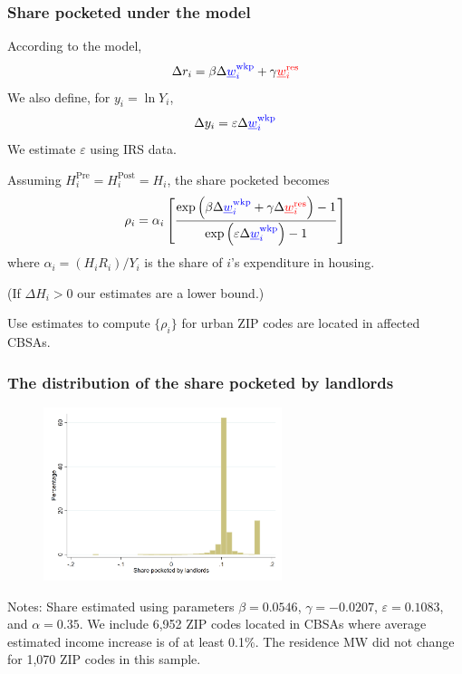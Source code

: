 \documentclass[aspectratio=169, t]{beamer}
\newcommand{\mw}{\underline{w}}
\newcommand{\wkp}{\text{wkp}}
\newcommand{\res}{\text{res}}
\newcommand{\pre}{\text{Pre}}
\newcommand{\post}{\text{Post}}
\begin{document}
\begin{frame}[label = share_pocketed_model]
    \frametitle{Share pocketed under the model}

    According to the model,
    $$
    \Delta r_i = \beta \Delta {\color{blue}\mw_i^{\wkp}} + \gamma {\color{red}\mw_i^{\res}}
    $$
    We also define, for $y_i = \ln Y_i$,
    $$
    \Delta y_i = \varepsilon \Delta {\color{blue}\mw_i^{\wkp}}
    $$
    We estimate $\varepsilon$ using IRS data. \hyperlink{wages_results}{}

    \pause
    \vspace{3mm}
    Assuming $H^{\pre}_i = H^{\post}_i = H_i$, the share pocketed becomes
    \begin{equation*}
        \rho_i = \alpha_i \left[
                  \frac{\exp \left( \beta \Delta {\color{blue}\mw_i^{\wkp}} 
                                 + \gamma \Delta {\color{red}\mw_i^{\res}} \right) - 1 }
                       {\exp \left( \varepsilon \Delta {\color{blue}\mw_i^{\wkp}}  \right) - 1 }
                         \right]
    \end{equation*}
    where $\alpha_i = \left(H_i R_i\right)/Y_i$ is the share of $i$'s expenditure in housing.
    
    {\small (If $\Delta H_i > 0$ our estimates are a lower bound.)}

    \pause
    \vspace{3mm}
    Use estimates to compute $\{\rho_i\}$ for urban ZIP codes are located in affected CBSAs.
\end{frame}

\begin{frame}
    \frametitle{The distribution of the share pocketed by landlords}
    
    \vspace{1mm}
    \begin{figure}
        \centering
        \includegraphics[width = 0.62\textwidth]{counterfactuals/output/hist_rho.png}
    \end{figure}   

    \vspace{-1mm}
    \scriptsize
    Notes: Share estimated using parameters $\beta = 0.0546$, $\gamma = -0.0207$, $\varepsilon = 0.1083$, and $\alpha=0.35$.
    We include 6,952 ZIP codes located in CBSAs where average estimated income increase
    is of at least 0.1\%. 
    The residence MW did not change for 1,070 ZIP codes in this sample.
\end{frame}
\end{document}
